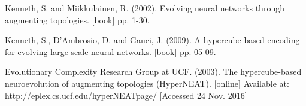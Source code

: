 \documentclass[11pt,a4paper]{article}
\begin{document}
\begin{thebibliography}{10}
	Kenneth, S. and Miikkulainen, R.
	(2002).
	Evolving neural networks through augmenting topologies.
	[book]
	pp. 1-30.
	
	Kenneth, S., D'Ambrosio, D. and Gauci, J.
	(2009).
	A hypercube-based encoding for evolving large-scale neural networks.
	[book]
	pp. 05-09.
	
	Evolutionary Complexity Research Group at UCF.
	(2003).
	The hypercube-based neuroevolution of augmenting topologies (HyperNEAT).
	[online]
	Available at: http://eplex.cs.ucf.edu/hyperNEATpage/
	[Accessed 24 Nov. 2016]
\end{thebibliography}
\end{document}
